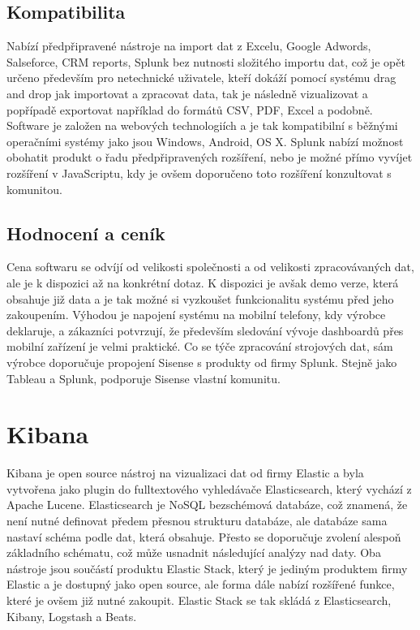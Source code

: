 \documentclass[czech,BP]{thesiskiv}
\begin{document}
\begin{itemize}
\begin{itemize}
 	\end{itemize}
 \end{itemize}
 
 \subsection{Kompatibilita}
  Nabízí předpřipravené nástroje na import dat z Excelu, Google Adwords, Salseforce, CRM reports, Splunk bez nutnosti složitého importu dat, což je opět určeno především pro netechnické uživatele, kteří dokáží pomocí systému drag and drop jak importovat a zpracovat data, tak je následně vizualizovat a popřípadě exportovat například do formátů CSV, PDF, Excel a podobně. Software je založen na webových technologiích a je tak kompatibilní s běžnými operačními systémy jako jsou Windows, Android, OS X. Splunk nabízí možnost obohatit produkt o řadu předpřipravených rozšíření, nebo je možné  přímo vyvíjet rozšíření v JavaScriptu, kdy je ovšem doporučeno toto rozšíření konzultovat s komunitou.
 \subsection{Hodnocení a ceník}
 Cena softwaru se odvíjí od  velikosti společnosti a od velikosti zpracovávaných dat, ale je k dispozici až na konkrétní dotaz. K dispozici je avšak demo verze, která obsahuje již data a je tak možné si vyzkoušet funkcionalitu systému před jeho zakoupením. Výhodou je napojení systému na mobilní telefony, kdy výrobce deklaruje, a zákazníci potvrzují, že především sledování vývoje dashboardů přes mobilní zařízení je velmi praktické. Co se týče zpracování strojových dat, sám výrobce doporučuje propojení Sisense s produkty od firmy Splunk. Stejně jako Tableau a Splunk, podporuje Sisense vlastní komunitu.
 
 
 \section{Kibana}
 Kibana je open source nástroj na vizualizaci dat od firmy Elastic a byla vytvořena jako plugin do fulltextového vyhledávače Elasticsearch, který vychází z Apache Lucene. Elasticsearch je NoSQL bezschémová databáze, což znamená, že není nutné definovat předem přesnou strukturu databáze, ale databáze sama nastaví schéma podle dat, která obsahuje. Přesto se doporučuje zvolení alespoň základního schématu, což může usnadnit následující analýzy nad daty.\cite{SchemaElastic} Oba nástroje jsou součástí produktu Elastic Stack, který je jediným produktem firmy Elastic a je dostupný jako open source, ale forma dále nabízí rozšířené funkce, které je ovšem již nutné zakoupit. Elastic Stack se tak skládá z Elasticsearch, Kibany, Logstash a Beats.
 
\end{document}
